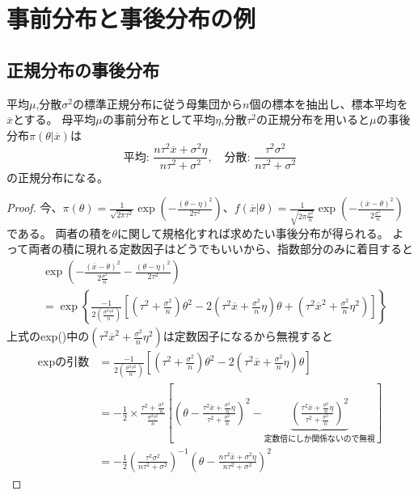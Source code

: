 \chapter{事前分布と事後分布の例}
    \section{正規分布の事後分布}
        \begin{shadebox}
            平均$\mu$,分散$\sigma^2$の標準正規分布に従う母集団から$n$個の標本を抽出し、標本平均を$\overline{x}$とする。
            母平均$\mu$の事前分布として平均$\eta$,分散$\tau^2$の正規分布を用いると$\mu$の事後分布$\pi(\theta|\overline{x})$は
            \[\textrm{平均: }\frac{n\tau^2\overline{x}+\sigma^2\eta}{n\tau^2+\sigma^2},\quad \textrm{分散: }\frac{\tau^2\sigma^2}{n\tau^2+\sigma^2}\]
            の正規分布になる。
        \end{shadebox}
        \begin{proof}
            \quad\par
            今、$\pi(\theta) = \frac{1}{\sqrt{2\pi\tau^2}}\exp{\left(-\frac{(\theta-\eta)^2}{2\tau^2}\right)}$、$f(\overline{x}|\theta) = \frac{1}{\sqrt{2\pi\frac{\sigma^2}{n}}}\exp{\left(-\frac{(\overline{x}-\theta)^2}{2\frac{\sigma^2}{n}}\right)}$である。
            両者の積を$\theta$に関して規格化すれば求めたい事後分布が得られる。
            よって両者の積に現れる定数因子はどうでもいいから、指数部分のみに着目すると
            \begin{align*}
                & \exp{\left(-\frac{(\overline{x}-\theta)^2}{2\frac{\sigma^2}{n}} - \frac{(\theta-\eta)^2}{2\tau^2}\right)} \\
                &= \exp{\left\{\frac{-1}{2\left(\frac{\sigma^2\tau^2}{n}\right)}\left[\left(\tau^2+\frac{\sigma^2}{n}\right)\theta^2 - 2(\tau^2\overline{x}+\frac{\sigma^2}{n}\eta)\theta + \left(\tau^2\overline{x}^2+\frac{\sigma^2}{n}\eta^2\right)\right]\right\}}
            \end{align*}
            上式のexp()中の$\left(\tau^2\overline{x}^2+\frac{\sigma^2}{n}\eta^2\right)$は定数因子になるから無視すると
            \begin{align*}
                \textrm{expの引数} &= \frac{-1}{2\left(\frac{\sigma^2\tau^2}{n}\right)}\left[\left(\tau^2+\frac{\sigma^2}{n}\right)\theta^2 - 2(\tau^2\overline{x}+\frac{\sigma^2}{n}\eta)\theta\right] \\
                &= -\frac{1}{2}\times\frac{\tau^2+\frac{\sigma^2}{n}}{\frac{\sigma^2\tau^2}{n}}\left[\left(\theta-\frac{\tau^2\overline{x}+\frac{\sigma^2}{n}\eta}{\tau^2+\frac{\sigma^2}{n}}\right)^2 - \underbrace{\left(\frac{\tau^2\overline{x}+\frac{\sigma^2}{n}\eta}{\tau^2+\frac{\sigma^2}{n}}\right)^2}_{定数倍にしか関係ないので無視}\right] \\
                &= -\frac{1}{2}\left(\frac{\tau^2\sigma^2}{n\tau^2+\sigma^2}\right)^{-1}\left(\theta-\frac{n\tau^2\overline{x}+\sigma^2\eta}{n\tau^2+\sigma^2}\right)^2
            \end{align*}
        \end{proof}